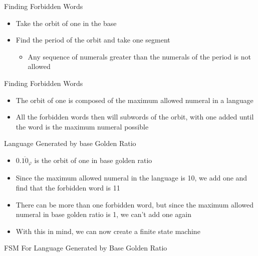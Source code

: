 \documentclass{beamer}
\begin{document}
\begin{frame}{Finding Forbidden Words}
  \begin{itemize}
    \item Take the orbit of one in the base \pause
    \item Find the period of the orbit and take one segment \pause
    \begin{itemize}
      \item Any sequence of numerals greater than the numerals of the period is not allowed
    \end{itemize}
  \end{itemize}
\end{frame}

\begin{frame}{Finding Forbidden Words}
  \begin{itemize}
    \item The orbit of one is composed of the maximum allowed numeral in a language \pause
    \item All the forbidden words then will subwords of the orbit, with one added until the word is the maximum numeral possible
  \end{itemize}
\end{frame}

\begin{frame}{Language Generated by base Golden Ratio}
  \begin{itemize}
    \item $0.\overline{10}_\varphi$ is the orbit of one in base golden ratio \pause
    \item Since the maximum allowed numeral in the language is 10, we add one and find that the forbidden word is 11 \pause
    \item There can be more than one forbidden word, but since the maximum allowed numeral in base golden ratio is 1, we can't add one again \pause
    \item With this in mind, we can now create a finite state machine
  \end{itemize}
\end{frame}

\begin{frame}{FSM For Language Generated by Base Golden Ratio}
  \begin{center}
  \end{center}
\end{frame}
\end{document}
